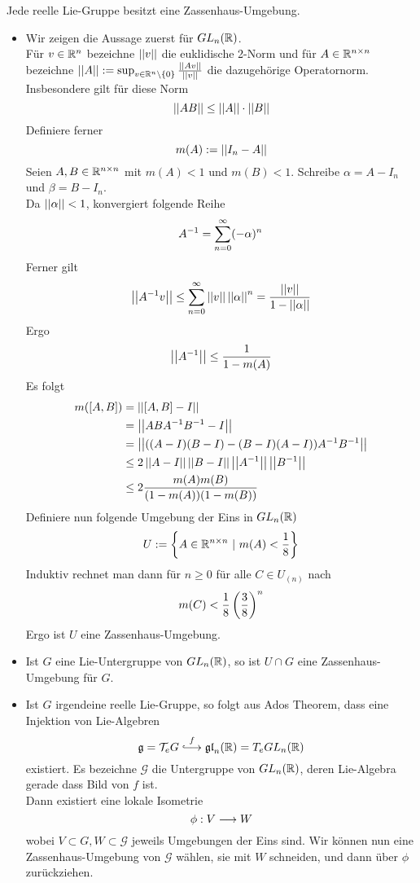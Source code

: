 \documentclass{book}
\newcommand{\g}{\mathfrak{g}}
\begin{document}
\Prop{}
Jede reelle Lie-Gruppe besitzt eine Zassenhaus-Umgebung.
\begin{Beweis}{}
	\begin{itemize}
		\item Wir zeigen die Aussage zuerst für $GL_n(\mathbb{R})$.\\
		Für $v \in \mathbb{R}^{n}$ bezeichne $\left|\left|v\right|\right|$ die euklidische 2-Norm und für $A \in \mathbb{R}^{n\times n}$ bezeichne $\left|\left|A\right|\right| := \sup_{v\in \mathbb{R}^n \setminus \{0\}} \frac{\left|\left|Av\right|\right|}{\left|\left|v\right|\right|}$ die dazugehörige Operatornorm. Insbesondere gilt für diese Norm
		\[ \left|\left|A B\right|\right| \leq \left|\left|A\right|\right| \cdot \left|\left|B\right|\right| \]
		Definiere ferner
		\[ m(A) := \left|\left|I_n-A\right|\right| \]
		Seien $A, B \in \mathbb{R}^{n\times n}$ mit $m(A) <1$ und $m(B) <1$. Schreibe $\alpha = A - I_n$ und $\beta = B - I_n$.\\
		Da $\left|\left|\alpha\right|\right| < 1$, konvergiert folgende Reihe
		\[ A^{-1} = \sum_{n = 0}^{\infty} (-\alpha)^n \]
		Ferner gilt
		\[ \left|\left|A^{-1} v\right|\right| \leq \sum_{n = 0}^{\infty} \left|\left|v\right|\right|\left|\left|\alpha\right|\right|^n = \frac{\left|\left|v\right|\right|}{1 - \left|\left|\alpha\right|\right|}  \]
		Ergo
		\[ \left|\left|A^{-1}\right|\right| \leq \frac{1}{1 - m(A)} \]
		Es folgt
		\begin{align*}
		m([A,B]) &= \left|\left| [A,B] - I \right|\right| \\
		&= \left|\left|ABA^{-1} B^{-1} - I\right|\right|\\
		&= \left|\left| ((A-I)(B-I) - (B-I)(A-I))A^{-1} B^{-1} \right|\right|\\
		&\leq 2 \left|\left|A-I\right|\right|\left|\left|B-I\right|\right| \left|\left|A^{-1} \right|\right|\left|\left|B^{-1}\right|\right|\\
		& \leq 2 \frac{m(A)m(B)}{(1-m(A)) (1-m(B))}
		\end{align*}
		Definiere nun folgende Umgebung der Eins in $GL_n(\mathbb{R})$
		\[ U:= \set{A\in \R^{n\times n}}{m(A) < \frac{1}{8}} \]
		Induktiv rechnet man dann für $n\geq 0$ für alle $C \in U_{(n)}$ nach
		\[ m(C) < \frac{1}{8} \left(\frac{3}{8}\right)^n \]
		Ergo ist $U$ eine Zassenhaus-Umgebung.
		\item Ist $G$ eine Lie-Untergruppe von $GL_n(\mathbb{R})$, so ist $U\cap G$ eine Zassenhaus-Umgebung für $G$.
		\item Ist $G$ irgendeine reelle Lie-Gruppe, so folgt aus Ados Theorem, dass eine Injektion von Lie-Algebren
		\[ \g = \T_eG \Inj{f} \mathfrak{gl}_n(\R) = T_eGL_n(\R) \]
		existiert. Es bezeichne $\mathcal{G}$ die Untergruppe von $GL_n(\mathbb{R})$, deren Lie-Algebra gerade dass Bild von $f$ ist.\\
		Dann existiert eine lokale Isometrie
		\[ \phi : V \overset{}{\longrightarrow} W \]
		wobei $V \subset G, W \subset \mathcal{G}$ jeweils Umgebungen der Eins sind. Wir können nun eine Zassenhaus-Umgebung von $\mathcal{G}$ wählen, sie mit $W$ schneiden, und dann über $\phi$ zurückziehen.
	\end{itemize}
\end{Beweis}
\end{document}
